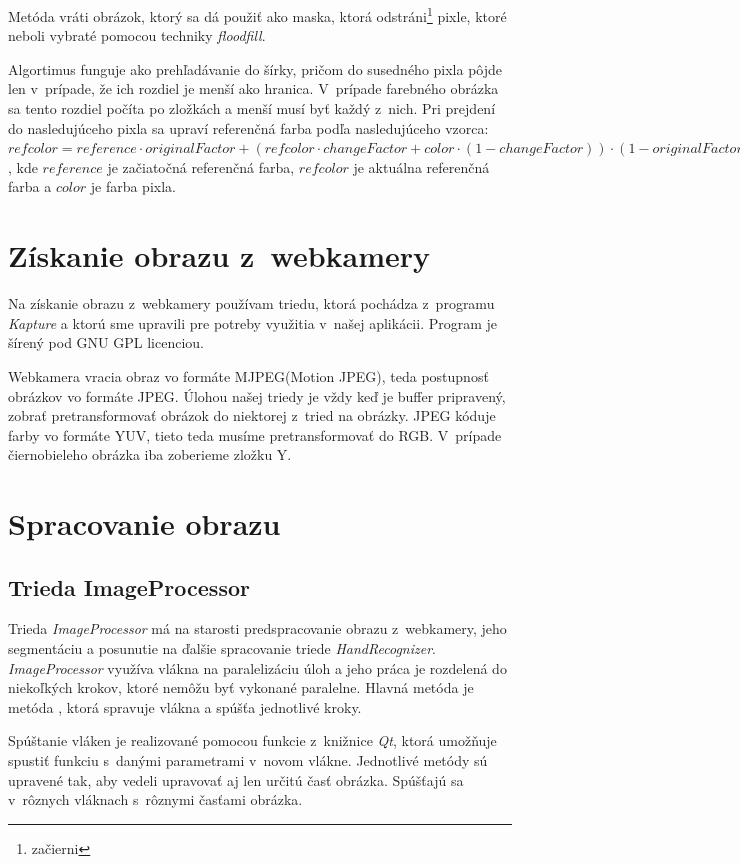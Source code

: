 Metóda vráti obrázok, ktorý sa dá použiť ako maska, ktorá odstráni\footnote{začierni} pixle, ktoré neboli vybraté pomocou techniky \textit{floodfill}.

Algortimus funguje ako prehľadávanie do šírky, pričom do susedného pixla pôjde len v~prípade, že ich rozdiel je menší ako hranica. V~prípade farebného obrázka sa tento rozdiel počíta po zložkách a menší musí byť každý z~nich. Pri prejdení do nasledujúceho pixla sa upraví referenčná farba podľa nasledujúceho vzorca: $refcolor = reference \cdot originalFactor + (refcolor\cdot changeFactor+color \cdot (1-changeFactor)) \cdot (1-originalFactor)$, kde $reference$ je začiatočná referenčná farba, $refcolor$ je aktuálna referenčná farba a $color$ je farba pixla.

\section{Získanie obrazu z~webkamery}
Na získanie obrazu z~webkamery používam triedu, ktorá pochádza z~programu \textit{Kapture} \cite{kapture} a ktorú sme upravili pre potreby využitia v~našej aplikácii. Program je šírený pod GNU GPL licenciou.

Webkamera vracia obraz vo formáte MJPEG(Motion JPEG), teda postupnosť obrázkov vo formáte JPEG. Úlohou našej triedy je vždy keď je buffer pripravený, zobrať pretransformovať obrázok do niektorej z~tried na obrázky. JPEG kóduje farby vo formáte YUV, tieto teda musíme pretransformovať do RGB. V~prípade čiernobieleho obrázka iba zoberieme zložku Y.

\section{Spracovanie obrazu}
\subsection{Trieda ImageProcessor}
Trieda \textit{ImageProcessor} má na starosti predspracovanie obrazu z~webkamery, jeho segmentáciu a posunutie na ďalšie spracovanie triede \textit{HandRecognizer}. \textit{ImageProcessor} využíva vlákna na paralelizáciu úloh a jeho práca je rozdelená do niekoľkých krokov, ktoré nemôžu byť vykonané paralelne. Hlavná metóda je metóda , ktorá spravuje vlákna a spúšťa jednotlivé kroky. 

Spúštanie vláken je realizované pomocou funkcie  z~knižnice \textit{Qt}, ktorá umožňuje spustiť funkciu s~danými parametrami v~novom vlákne. Jednotlivé metódy sú upravené tak, aby vedeli upravovať aj len určitú časť obrázka. Spúšťajú sa v~rôznych vláknach s~rôznymi časťami obrázka. %

